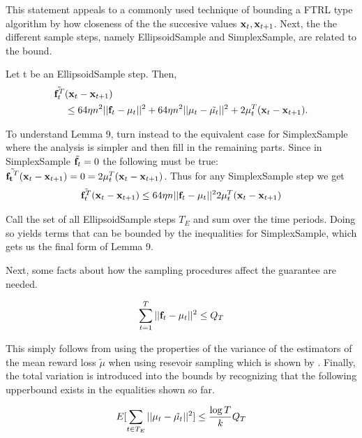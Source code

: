 This statement appeals to a commonly used technique of bounding a FTRL type algorithm by how closeness of the the succesive values ${\bf x}_t, {\bf x}_{t+1}$. Next, the the different sample steps, namely EllipsoidSample and SimplexSample, are related to the bound.

\begin{clemma}{9}
Let t be an EllipsoidSample step. Then,
	\begin{align}
  		\tilde{{\bf f}_t^T} & ({\bf x}_t - {\bf x}_{t+1})\\
  		&\leq 64 \eta n^2 ||{\bf f}_t - {\bf \mu}_t ||^2 + 64 \eta n^2 ||{\bf \mu}_t - \tilde{{\bf \mu}_t} ||^2 + 2 {\bf \mu}_t^T ({\bf x}_t - {\bf x}_{t+1})\notag.
	\end{align} 
\end{clemma}

To understand Lemma 9, turn instead to the equivalent case for SimplexSample where the analysis
is simpler and then fill in the remaining parts. Since in SimplexSample $\tilde{{\bf f}_t} = 0$ the following must be true: 
$\tilde{{\bf f_t}^T}({\bf x}_t - {\bf x}_{t+1})= 0 = 2 {\bf \mu}_t^T ({\bf x}_t - {\bf x}_{t+1})$. Thus for any SimplexSample step we get 
\begin{align*}
	\tilde{{\bf f}_t^T}({\bf x}_t - {\bf x}_{t+1}) \leq 64 \eta n ||{\bf f}_t - {\bf \mu}_t ||^2 2{\bf \mu}_t^T ({\bf x}_t - {\bf x}_{t+1})
\end{align*}

Call the set of all EllipsoidSample steps $T_E$ and sum over the time periods. Doing so yields terms that can be bounded by the inequalities for SimplexSample, which gets us the final form of Lemma 9.

Next, some facts about how the sampling procedures affect the guarantee are needed.
\begin{clemma}{10}
	\begin{equation}
  		\sum_{t=1}^T ||{\bf f}_t - {\bf \mu}_t||^2 \leq Q_T
	\end{equation}
\end{clemma}

This simply follows from using the properties of the variance of the estimators of the mean reward loss $\tilde{\mu}$ when using resevoir sampling which is shown by \citep{vitter}. Finally, the total variation is introduced into the bounds by recognizing that the following upperbound exists in the equalities shown so far.

\begin{clemma}{11}
	\begin{equation}
  		E[\sum_{t \in T_E} ||{\bf \mu}_t - \tilde{{\bf \mu}_t} ||^2] \leq \frac{\log T}{k} Q_T
	\end{equation}
\end{clemma}

